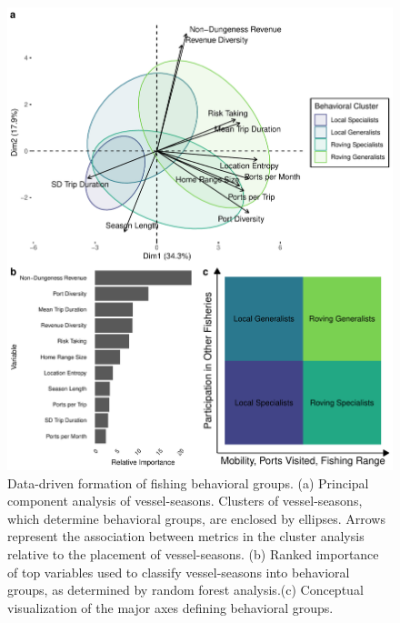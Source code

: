 \documentclass[9pt,twocolumn,twoside,lineno]{pnas-new}
\begin{document}
\begin{figure}%
\includegraphics[width=\linewidth]{fig_pca_rf.pdf}
\caption{Data-driven formation of fishing behavioral groups. (a) Principal component analysis of vessel-seasons. Clusters of vessel-seasons, which determine behavioral groups, are enclosed by ellipses. Arrows represent the association between metrics in the cluster analysis relative to the placement of vessel-seasons. (b) Ranked importance of top variables used to classify vessel-seasons into behavioral groups, as determined by random forest analysis.(c) Conceptual visualization of the major axes defining behavioral groups.}
\label{fig:pca}
\end{figure}
\end{document}
